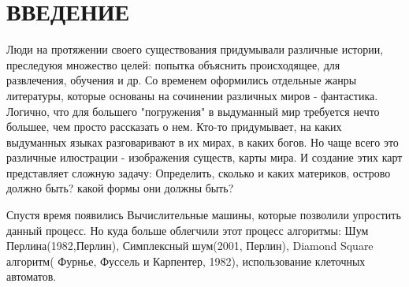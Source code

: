 \chapter*{\large ВВЕДЕНИЕ}  
Люди на протяжении своего существования придумывали различные истории, преследуюя множество целей: попытка объяснить происходящее, для развлечения, обучения и др. Со временем оформились отдельные жанры литературы, которые основаны на сочинении различных миров - фантастика. Логично, что для большего "погружения" в выдуманный мир требуется нечто большее, чем просто рассказать о нем. Кто-то придумывает, на каких выдуманных языках разговаривают в их мирах, в каких богов. Но чаще всего это различные илюстрации -  изображения существ, карты мира. И создание этих карт  представляет сложную задачу: Определить, сколько и каких материков, острово должно быть? какой формы они должны быть?

Спустя время появились Вычислительные машины, которые позволили упростить данный процесс. Но куда больше облегчили этот процесс алгоритмы: Шум Перлина(1982,Перлин), Симплексный шум(2001, Перлин), Diamond Square алгоритм( Фурнье, Фуссель и Карпентер, 1982), использование клеточных автоматов.